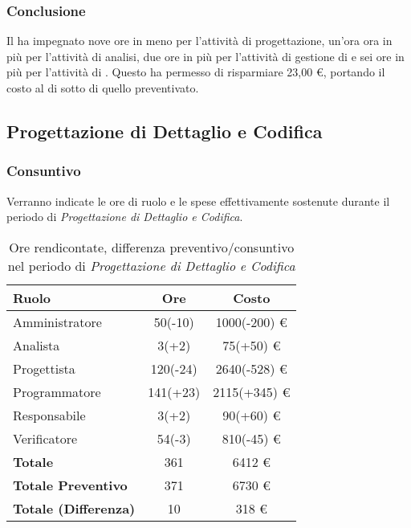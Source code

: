 \subsubsection{Conclusione}
Il  ha impegnato nove ore in meno per l'attivit\`a di progettazione, un'ora ora in più per l'attivit\`a di analisi, due ore in pi\`u per l'attivit\`a di gestione di  e sei ore in pi\`u per l'attivit\`a di . Questo ha permesso di risparmiare 23,00 \euro{}, portando il costo  al di sotto di quello preventivato.

\subsection{Progettazione di Dettaglio e Codifica}
\subsubsection{Consuntivo}
Verranno indicate le ore di ruolo e le spese effettivamente sostenute durante il periodo di \textit{Progettazione di Dettaglio e Codifica}.

\begin{table}[H]
	\centering
	\begin{tabular}{ l c c }
		\textbf{Ruolo} & \textbf{Ore} & \textbf{Costo} \\
		\hline
		Amministratore & 50(-10) & 1000(-200) \euro{} \\
		Analista & 3(+2) & 75(+50) \euro{} \\
		Progettista & 120(-24) & 2640(-528) \euro{} \\ %
		Programmatore & 141(+23) & 2115(+345) \euro{} \\ %
		Responsabile & 3(+2) & 90(+60) \euro{} \\
		Verificatore & 54(-3) & 810(-45) \euro{} \\
		\hline
		\textbf{Totale \glossaryItem{Consuntivo}} & 361 & 6412 \euro{} \\
		\hline
		\textbf{Totale Preventivo} & 371 & 6730 \euro{} \\
		\hline
		\textbf{Totale (Differenza)} & 10 & 318 \euro{} \\
		\hline
	\end{tabular}
	\caption{Ore rendicontate, differenza preventivo/consuntivo nel periodo di \textit{Progettazione di Dettaglio e Codifica}}
\end{table}



